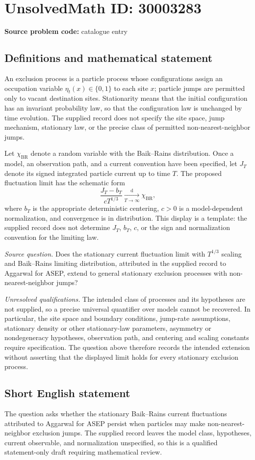 \documentclass[11pt]{article}
\begin{document}
\section*{UnsolvedMath ID: 30003283}
\textbf{Source problem code:} catalogue entry
\subsection{Definitions and mathematical statement}
An exclusion process is a particle process whose configurations assign an occupation variable \(\eta_t(x)\in\{0,1\}\) to each site \(x\); particle jumps are permitted only to vacant destination sites. Stationarity means that the initial configuration has an invariant probability law, so that the configuration law is unchanged by time evolution. The supplied record does not specify the site space, jump mechanism, stationary law, or the precise class of permitted non-nearest-neighbor jumps.

Let \(\chi_{\mathrm{BR}}\) denote a random variable with the Baik--Rains distribution. Once a model, an observation path, and a current convention have been specified, let \(J_T\) denote its signed integrated particle current up to time \(T\). The proposed fluctuation limit has the schematic form
\[
\frac{J_T-b_T}{cT^{1/3}}\xrightarrow[T\to\infty]{\mathrm{d}}\chi_{\mathrm{BR}},
\]
where \(b_T\) is the appropriate deterministic centering, \(c>0\) is a model-dependent normalization, and convergence is in distribution. This display is a template: the supplied record does not determine \(J_T\), \(b_T\), \(c\), or the sign and normalization convention for the limiting law.

\emph{Source question.} Does the stationary current fluctuation limit with \(T^{1/3}\) scaling and Baik--Rains limiting distribution, attributed in the supplied record to Aggarwal for ASEP, extend to general stationary exclusion processes with non-nearest-neighbor jumps?

\emph{Unresolved qualifications.} The intended class of processes and its hypotheses are not supplied, so a precise universal quantifier over models cannot be recovered. In particular, the site space and boundary conditions, jump-rate assumptions, stationary density or other stationary-law parameters, asymmetry or nondegeneracy hypotheses, observation path, and centering and scaling constants require specification. The question above therefore records the intended extension without asserting that the displayed limit holds for every stationary exclusion process.
\subsection{Short English statement}
The question asks whether the stationary Baik--Rains current fluctuations attributed to Aggarwal for ASEP persist when particles may make non-nearest-neighbor exclusion jumps. The supplied record leaves the model class, hypotheses, current observable, and normalization unspecified, so this is a qualified statement-only draft requiring mathematical review.
\end{document}
